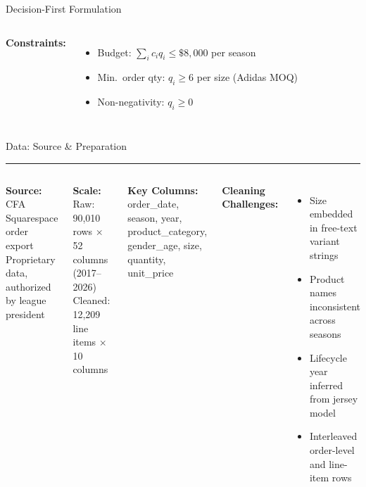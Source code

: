 \documentclass[aspectratio=169, 9pt]{beamer}
\newcommand{\goldrule}{\textcolor{PurdueGold}{\rule{\linewidth}{1.2pt}}}
\begin{document}
\begin{frame}{Decision-First Formulation}
\begin{columns}[T]
{\small\textbf{\color{AgedGold}Constraints:}}
\begin{itemize}\scriptsize
  \item Budget: $\sum_i c_i q_i \leq \$8{,}000$ per season
  \item Min.\ order qty: $q_i \geq 6$ per size (Adidas MOQ)
  \item Non-negativity: $q_i \geq 0$
\end{itemize}
\end{columns}
\end{frame}

\begin{frame}{Data: Source \& Preparation}
\goldrule
\vspace{2pt}
\begin{columns}[T]
{\small\textbf{\color{AgedGold}Source:} CFA Squarespace order export}\\
{\scriptsize Proprietary data, authorized by league president}

\vspace{3pt}
{\small\textbf{\color{AgedGold}Scale:}}\\
{\scriptsize Raw: 90,010 rows $\times$ 52 columns (2017--2026)\\
Cleaned: 12,209 line items $\times$ 10 columns}

\vspace{3pt}
{\small\textbf{\color{AgedGold}Key Columns:}}\\
{\scriptsize order\_date, season, year, product\_category, gender\_age, size, quantity, unit\_price}

\vspace{3pt}
{\small\textbf{\color{AgedGold}Cleaning Challenges:}}
\begin{itemize}\scriptsize
  \item Size embedded in free-text variant strings
  \item Product names inconsistent across seasons
  \item Lifecycle year inferred from jersey model
  \item Interleaved order-level and line-item rows
\end{itemize}


\end{columns}
\end{frame}
\end{document}
